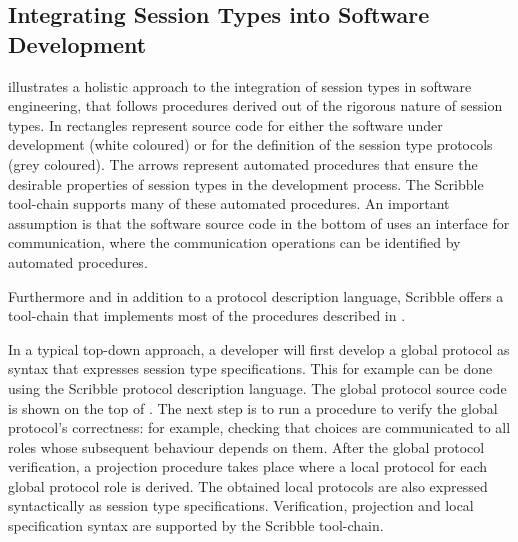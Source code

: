 \subsection{Integrating Session Types into Software Development}%
\label{sec:sessions_integrate}

 illustrates a holistic approach to the integration of session
types in software engineering, that follows procedures derived out of the rigorous
nature of session types. In  rectangles
represent source code for either the software
under development (white coloured) or for the definition
of the session type protocols (grey coloured). 
The arrows
represent automated procedures that ensure
the desirable properties of session types
in the development process. The Scribble
tool-chain supports many of these automated
procedures.
An important assumption
is that the software source code in the
bottom of  uses an interface
for communication, where the communication
operations can be identified by automated
procedures.

Furthermore and in addition to a protocol description language,
Scribble offers a tool-chain that implements most of the procedures
described in .







In a typical top-down approach, a developer will first develop a global protocol
as syntax that expresses session type specifications.
This for example can be done
using the Scribble protocol description language.
The global protocol source code is shown
on the top of .
The next step is to run a procedure to verify the 
global protocol's correctness: for example, checking that choices
are communicated to all roles whose subsequent behaviour depends on them.
After the global protocol verification, a projection
procedure takes place where a local protocol
for each global protocol role is derived.
The obtained local protocols are also expressed
syntactically as session type specifications.
Verification, projection and local specification
syntax are supported by the Scribble tool-chain.

